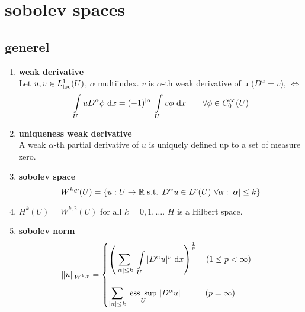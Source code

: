 \section{sobolev spaces}

\subsection{generel}

\begin{enumerate}[label=(\alph*)]
	\item \textbf{weak derivative}\\
	Let $u,v \in L^1_{\text{loc}}(U)$, $\alpha$ multiindex. $v$ is $\alpha$-th weak derivative of u ($D^{\alpha} = v$), $\iff$
	\begin{equation*}
	\int \limits_U u D^{\alpha}\phi \text{ d} x = (-1)^{|\alpha|} \int \limits_U v\phi \text{ d} x \qquad \forall \phi \in C^\infty_0(U)
	\end{equation*}
	
	\item \textbf{uniqueness weak derivative}\\
	A weak  $\alpha$-th partial derivative of $u$ is uniquely defined up to a set of measure zero.
	
	\item \textbf{sobolev space}\\
	\begin{equation*}
		W^{k,p}(U) = \{ u: U \to \mathbb{R} \text{ s.t. } D^{\alpha}u \in L^p(U)\  \forall \alpha: |\alpha| \leq k \}
	\end{equation*}
	\item $H^k(U) = W^{k,2}(U)$ for all $k = 0,1,\dots$. $H$ is a Hilbert space.
	
	\item \textbf{sobolev norm}
	\begin{equation*}
		\|u\|_{W^{k,p}} = 
		\begin{cases}
		\left( \displaystyle \sum_{|\alpha|\leq k}\  \int \limits_U |D^{\alpha}u|^p  \text{ d} x \right)^{\frac{1}{p}} \quad (1 \leq p< \infty)\\
		\\
		\displaystyle \sum_{|\alpha|\leq k}\  \underset{U}{\text{ess }\sup}\  |D^{\alpha}u| \qquad \quad  (p = \infty)
		\end{cases}
	\end{equation*}
	

\end{enumerate}
